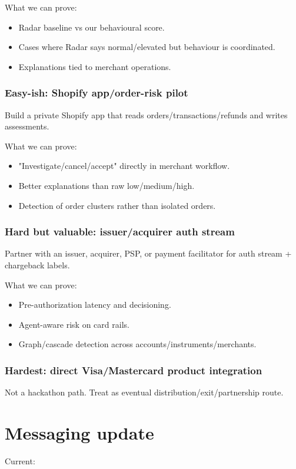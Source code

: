 \documentclass[11pt]{article}
\begin{document}
What we can prove:

\begin{itemize}
  \item Radar baseline vs our behavioural score.
  \item Cases where Radar says normal/elevated but behaviour is coordinated.
  \item Explanations tied to merchant operations.
\end{itemize}
\subsubsection*{Easy-ish: Shopify app/order-risk pilot}
Build a private Shopify app that reads orders/transactions/refunds and writes  assessments.

What we can prove:

\begin{itemize}
  \item "Investigate/cancel/accept" directly in merchant workflow.
  \item Better explanations than raw low/medium/high.
  \item Detection of order clusters rather than isolated orders.
\end{itemize}
\subsubsection*{Hard but valuable: issuer/acquirer auth stream}
Partner with an issuer, acquirer, PSP, or payment facilitator for auth stream + chargeback labels.

What we can prove:

\begin{itemize}
  \item Pre-authorization latency and decisioning.
  \item Agent-aware risk on card rails.
  \item Graph/cascade detection across accounts/instruments/merchants.
\end{itemize}
\subsubsection*{Hardest: direct Visa/Mastercard product integration}
Not a hackathon path. Treat as eventual distribution/exit/partnership route.

\section{Messaging update}
Current:
\end{document}
